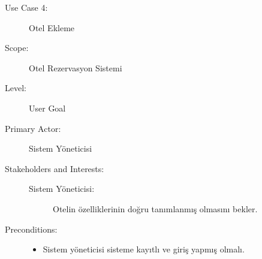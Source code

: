 \documentclass[12pt,a4paper]{report}
\begin{document}
\newpage

\begin{description}
\item[Use Case 4:] Otel Ekleme \\
\item[Scope:] Otel Rezervasyon Sistemi
\item[Level:] User Goal
\item[Primary Actor:] Sistem Yöneticisi 
\item[Stakeholders and Interests:] \hspace{10 mm}
\begin{description} 
\item[Sistem Yöneticisi:] Otelin özelliklerinin doğru tanımlanmış olmasını bekler.
\end{description}
\item[Preconditions:] \hspace{10mm}
\begin{itemize}
\item Sistem yöneticisi sisteme kayıtlı ve giriş yapmış olmalı.
\end{itemize}


\end{description}
\end{document}
